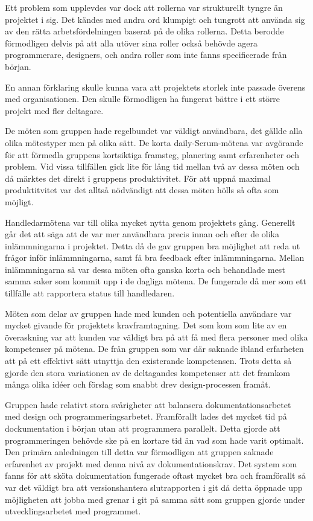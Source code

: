 Ett problem som upplevdes var dock att rollerna var strukturellt tyngre än projektet i sig. Det kändes med andra ord klumpigt och tungrott att använda sig av den rätta arbetsfördelningen baserat på de olika rollerna. Detta berodde förmodligen delvis på att alla utöver sina roller också behövde agera programmerare, designers, och andra roller som inte fanns specificerade från början.

En annan förklaring skulle kunna vara att projektets storlek inte passade överens med organisationen. Den skulle förmodligen ha fungerat bättre i ett större projekt med fler deltagare.

De möten som gruppen hade regelbundet var väldigt användbara, det gällde alla olika mötestyper men på olika sätt. De korta daily-Scrum-mötena var avgörande för att förmedla gruppens kortsiktiga framsteg, planering samt erfarenheter och problem. Vid vissa tillfällen gick lite för lång tid mellan två av dessa möten och då märktes det direkt i gruppens produktivitet. För att uppnå maximal produktitvitet var det alltså nödvändigt att dessa möten hölls så ofta som möjligt.

Handledarmötena var till olika mycket nytta genom projektets gång. Generellt går det att säga att de var mer användbara precis innan och efter de olika inlämmningarna i projektet. Detta då de gav gruppen bra möjlighet att reda ut frågor inför inlämmningarna, samt få bra feedback efter inlämmningarna.
Mellan inlämmningarna så var dessa möten ofta ganska korta och behandlade mest samma saker som kommit upp i de dagliga mötena. De fungerade då mer som ett tillfälle att rapportera status till handledaren.

Möten som delar av gruppen hade med kunden och potentiella användare var mycket givande för projektets kravframtagning. Det som kom som lite av en överaskning var att kunden var väldigt bra på att få med flera personer med olika kompetenser på mötena. De från gruppen som var där saknade ibland erfarheten att på ett effektivt sätt utnyttja den existerande kompetensen.
Trots detta så gjorde den stora variationen av de deltagandes kompetenser att det framkom många olika idéer och förslag som snabbt drev design-processen framåt.

Gruppen hade relativt stora svårigheter att balansera dokumentationsarbetet med design och programmeringsarbetet. Framförallt lades det mycket tid på dockumentation i början utan att programmera parallelt. Detta gjorde att programmeringen behövde ske på en kortare tid än vad som hade varit optimalt. Den primära anledningen till detta var förmodligen att gruppen saknade erfarenhet av projekt med denna nivå av dokumentationskrav. Det system som fanns för att sköta dokumentation fungerade oftast mycket bra och framförallt så var det väldigt bra att versionshantera slutrapporten i git då detta öppnade upp möjligheten att jobba med grenar i git på samma sätt som gruppen gjorde under utvecklingsarbetet med programmet.

